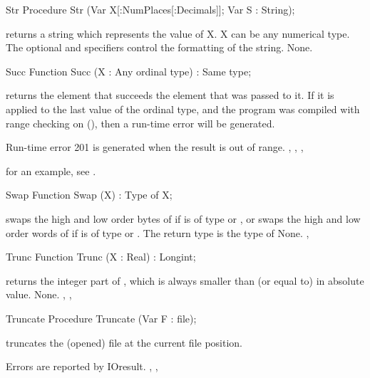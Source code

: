 \documentclass{report}
\begin{document}

\begin{procedure}{Str}
\Declaration
Procedure Str (Var X[:NumPlaces[:Decimals]]; Var S : String);

\Description
{} returns a string which represents the value of X. X can be any
numerical type.
The optional  and  specifiers control the
formatting of the string.
\Errors
None.
\SeeAlso
{}
\end{procedure}


\begin{function}{Succ}
\Declaration
Function Succ (X : Any ordinal type) : Same type;

\Description
  returns the element that succeeds the element that was passed
to it. If it is applied to the last value of the ordinal type, and the
program was compiled with range checking on (), then a run-time
error will be generated.

\Errors
Run-time error 201 is generated when the result is out of
range.
\SeeAlso
{}, , , 
\end{function}
for an example, see .
\begin{function}{Swap}
\Declaration
Function Swap (X) : Type of X;

\Description
{} swaps the high and low order bytes of  if  is of
type  or , or swaps the high and low order words of
 if  is of type  or .
The return type is the type of 
\Errors
None.
\SeeAlso
{}, 
\end{function}


\begin{function}{Trunc}
\Declaration
Function Trunc (X : Real) : Longint;

\Description
{} returns the integer part of , 
which is always smaller than (or equal to)  in absolute value.
\Errors
None.
\SeeAlso
{}, , 
\end{function}


\begin{procedure}{Truncate}
\Declaration
Procedure Truncate (Var F : file);

\Description
{} truncates the (opened) file  at the current file
position.

\Errors
Errors are reported by IOresult.
\SeeAlso
{}, ,
\end{procedure}
\end{document}
